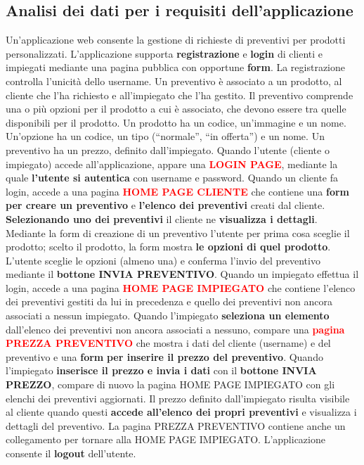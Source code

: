 \documentclass[a4paper, 12pt]{article}
\begin{document}
\subsection{Analisi dei dati per i requisiti dell'applicazione} %
Un’applicazione web consente la gestione di richieste di preventivi per prodotti personalizzati. L’applicazione supporta \textbf{\textcolor{myBrown}{registrazione}} e \textbf{\textcolor{myBrown}{login}} di clienti e impiegati mediante una pagina pubblica con opportune \textbf{\textcolor{myGreen}{form}}. La registrazione controlla l’unicità dello username. Un preventivo è associato a un prodotto, al cliente che l’ha richiesto e all’impiegato che l’ha gestito. Il preventivo comprende una o più opzioni per il prodotto a cui è associato, che devono essere tra quelle disponibili per il prodotto. Un prodotto ha un codice, un’immagine e un nome. Un’opzione ha un codice, un tipo (“normale”, “in offerta”) e un nome. Un preventivo ha un prezzo, definito dall’impiegato. Quando l’utente (cliente o impiegato) accede all’applicazione, appare una \textbf{\textcolor{red}{LOGIN PAGE}}, mediante la quale \textbf{\textcolor{myBlue}{l’utente si autentica}} con username e password. Quando un cliente fa login, accede a una pagina \textbf{\textcolor{red}{HOME PAGE CLIENTE}} che contiene una \textbf{\textcolor{myGreen}{form}} \textbf{\textcolor{myBrown}{per creare un preventivo}} e \textbf{\textcolor{myGreen}{l’elenco dei preventivi}} creati dal cliente. \textbf{\textcolor{myBlue}{Selezionando uno dei preventivi}} il cliente ne \textbf{\textcolor{myGreen}{visualizza i dettagli}}. Mediante la form di creazione di un preventivo l’utente per prima cosa sceglie il prodotto; scelto il prodotto, la form mostra \textbf{\textcolor{myGreen}{le opzioni di quel prodotto}}. L’utente sceglie le opzioni (almeno una) e conferma l’invio del preventivo mediante il \textbf{\textcolor{myGreen}{bottone INVIA PREVENTIVO}}. Quando un impiegato effettua il login, accede a una pagina \textbf{\textcolor{red}{HOME PAGE IMPIEGATO}} che contiene l’elenco dei preventivi gestiti da lui in precedenza e quello dei preventivi non ancora associati a nessun impiegato. Quando l’impiegato \textbf{\textcolor{myBlue}{seleziona un elemento}} dall’elenco dei preventivi non ancora associati a nessuno, compare una \textbf{\textcolor{red}{pagina PREZZA PREVENTIVO}} che mostra i dati del cliente (username) e del preventivo e una \textbf{\textcolor{myGreen}{form}} \textbf{\textcolor{myBrown}{per inserire il prezzo del preventivo}}. Quando l’impiegato \textbf{\textcolor{myBlue}{inserisce il prezzo e invia i dati}} con il \textbf{\textcolor{myGreen}{bottone INVIA PREZZO}}, compare di nuovo la pagina HOME PAGE IMPIEGATO con gli elenchi dei preventivi aggiornati. Il prezzo definito dall’impiegato risulta visibile al cliente quando questi \textbf{\textcolor{myBlue}{accede all’elenco dei propri preventivi}} e visualizza i dettagli del preventivo. La pagina PREZZA PREVENTIVO contiene anche un collegamento per tornare alla HOME PAGE IMPIEGATO. L’applicazione consente il \textbf{\textcolor{myBrown}{logout}} dell’utente.\\
\end{document}
